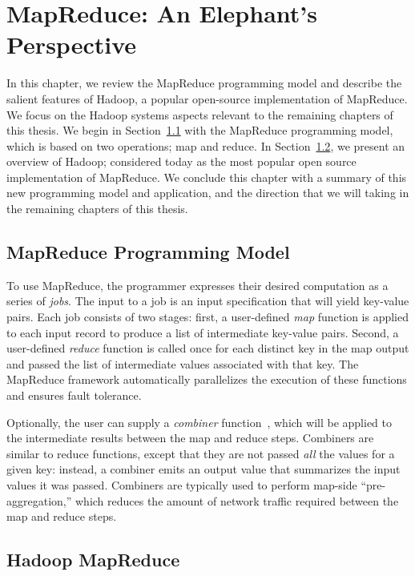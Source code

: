\chapter[MapReduce: An Elephant's Perspective]{MapReduce: An Elephant's Perspective}
\label{ch:hadoop}

In this chapter, we review the MapReduce programming model and describe the
salient features of Hadoop, a popular open-source implementation of MapReduce.
We focus on the Hadoop systems aspects relevant to the remaining chapters of
this thesis.  We begin in Section~\ref{ch:hadoop:sec:progmodel} with the
MapReduce programming model, which is based on two operations; map and reduce.
In Section~\ref{ch:hadoop:sec:hadoop}, we present an overview of Hadoop;
considered today as the most popular open source implementation of MapReduce.
We conclude this chapter with a summary of this new programming model and
application, and the direction that we will taking in the remaining chapters of
this thesis.  

\section{MapReduce Programming Model}
\label{ch:hadoop:sec:progmodel}

To use MapReduce, the programmer expresses their desired computation as a
series of \emph{jobs}.  The input to a job is an input specification that will
yield key-value pairs.  Each job consists of two stages: first, a user-defined
\emph{map} function is applied to each input record to produce a list of
intermediate key-value pairs.  Second, a user-defined \emph{reduce} function is
called once for each distinct key in the map output and passed the list of
intermediate values associated with that key.  The MapReduce framework
automatically parallelizes the execution of these functions and ensures fault
tolerance.

Optionally, the user can supply a \emph{combiner}
function~\cite{mapreduce-osdi}, which will be applied to the intermediate results
between the map and reduce steps.  Combiners are similar to reduce functions,
except that they are not passed \emph{all} the values for a given key: instead,
a combiner emits an output value that summarizes the input values it was
passed.  Combiners are typically used to perform map-side ``pre-aggregation,''
which reduces the amount of network traffic required between the map and reduce
steps.

\section{Hadoop MapReduce}
\label{ch:hadoop:sec:hadoop}

